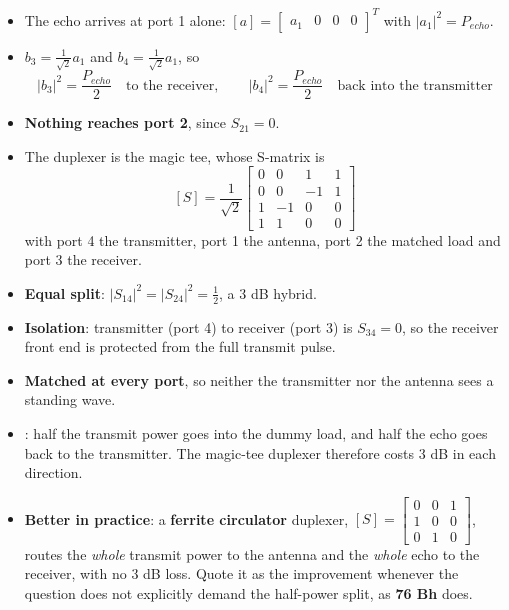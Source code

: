 \begin{itemize}
  \item The echo arrives at port 1 alone: $[a] = \begin{bmatrix} a_1&0&0&0
    \end{bmatrix}^{T}$ with $|a_1|^2 = P_{echo}$.
  \item $b_3 = \tfrac{1}{\sqrt{2}}a_1$ and $b_4 = \tfrac{1}{\sqrt{2}}a_1$, so
    \[ |b_3|^2 = \frac{P_{echo}}{2} \quad\text{to the receiver}, \qquad
       |b_4|^2 = \frac{P_{echo}}{2} \quad\text{back into the transmitter} \]
  \item \textbf{Nothing reaches port 2}, since $S_{21} = 0$.
\end{itemize}
\begin{itemize}
  \item The duplexer is the magic tee, whose S-matrix is
    \[ \boxed{\;[S] = \frac{1}{\sqrt{2}}\begin{bmatrix}
       0 & 0 & 1 & 1 \\ 0 & 0 & -1 & 1 \\ 1 & -1 & 0 & 0 \\ 1 & 1 & 0 & 0
       \end{bmatrix}\;} \]
    with port 4 the transmitter, port 1 the antenna, port 2 the matched load and port 3
    the receiver.
\end{itemize}
\begin{itemize}
  \item \textbf{Equal split}: $|S_{14}|^2 = |S_{24}|^2 = \tfrac{1}{2}$, a $3$ dB hybrid.
  \item \textbf{Isolation}: transmitter (port 4) to receiver (port 3) is $S_{34} = 0$, so
    the receiver front end is protected from the full transmit pulse.
  \item \textbf{Matched at every port}, so neither the transmitter nor the antenna sees a
    standing wave.
  \item {}: half the transmit power goes
    into the dummy load, and half the echo goes back to the transmitter. The magic-tee
    duplexer therefore costs $3$ dB in each direction.
  \item \textbf{Better in practice}: a \textbf{ferrite circulator} duplexer,
    $[S] = \left[\begin{smallmatrix}0&0&1\\1&0&0\\0&1&0\end{smallmatrix}\right]$, routes
    the \emph{whole} transmit power to the antenna and the \emph{whole} echo to the
    receiver, with no $3$ dB loss. Quote it as the improvement whenever the question does
    not explicitly demand the half-power split, as \textbf{76 Bh} does.
\end{itemize}

\vspace{2pt}
